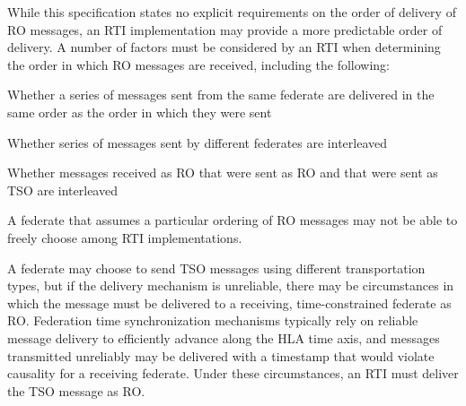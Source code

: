 \begin{annexstdpage}
    While this specification states no explicit requirements on the order of delivery of RO messages, an RTI implementation may provide a more predictable order of delivery. A number of factors must be considered by an RTI when determining the order in which RO messages are received, including the following:

    \begin{stddashlist}
        \item Whether a series of messages sent from the same federate are delivered in the same order as the order in which they were sent
        \item Whether series of messages sent by different federates are interleaved
        \item Whether messages received as RO that were sent as RO and that were sent as TSO are interleaved
    \end{stddashlist}

    A federate that assumes a particular ordering of RO messages may not be able to freely choose among RTI implementations.

    A federate may choose to send TSO messages using different transportation types, but if the delivery mechanism is unreliable, there may be circumstances in which the message must be delivered to a receiving, time-constrained federate as RO. Federation time synchronization mechanisms typically rely on reliable message delivery to efficiently advance along the HLA time axis, and messages transmitted unreliably may be delivered with a timestamp that would violate causality for a receiving federate. Under these circumstances, an RTI must deliver the TSO message as RO.
\end{annexstdpage}

\clearpage

